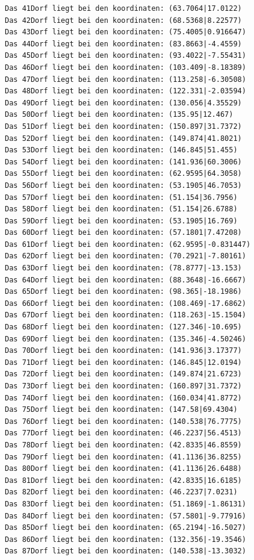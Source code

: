 \documentclass{article}
\begin{document}
\begin{verbatim}
Das 41Dorf liegt bei den koordinaten: (63.7064|17.0122)
Das 42Dorf liegt bei den koordinaten: (68.5368|8.22577)
Das 43Dorf liegt bei den koordinaten: (75.4005|0.916647)
Das 44Dorf liegt bei den koordinaten: (83.8663|-4.4559)
Das 45Dorf liegt bei den koordinaten: (93.4022|-7.55431)
Das 46Dorf liegt bei den koordinaten: (103.409|-8.18389)
Das 47Dorf liegt bei den koordinaten: (113.258|-6.30508)
Das 48Dorf liegt bei den koordinaten: (122.331|-2.03594)
Das 49Dorf liegt bei den koordinaten: (130.056|4.35529)
Das 50Dorf liegt bei den koordinaten: (135.95|12.467)
Das 51Dorf liegt bei den koordinaten: (150.897|31.7372)
Das 52Dorf liegt bei den koordinaten: (149.874|41.8021)
Das 53Dorf liegt bei den koordinaten: (146.845|51.455)
Das 54Dorf liegt bei den koordinaten: (141.936|60.3006)
Das 55Dorf liegt bei den koordinaten: (62.9595|64.3058)
Das 56Dorf liegt bei den koordinaten: (53.1905|46.7053)
Das 57Dorf liegt bei den koordinaten: (51.154|36.7956)
Das 58Dorf liegt bei den koordinaten: (51.154|26.6788)
Das 59Dorf liegt bei den koordinaten: (53.1905|16.769)
Das 60Dorf liegt bei den koordinaten: (57.1801|7.47208)
Das 61Dorf liegt bei den koordinaten: (62.9595|-0.831447)
Das 62Dorf liegt bei den koordinaten: (70.2921|-7.80161)
Das 63Dorf liegt bei den koordinaten: (78.8777|-13.153)
Das 64Dorf liegt bei den koordinaten: (88.3648|-16.6667)
Das 65Dorf liegt bei den koordinaten: (98.365|-18.1986)
Das 66Dorf liegt bei den koordinaten: (108.469|-17.6862)
Das 67Dorf liegt bei den koordinaten: (118.263|-15.1504)
Das 68Dorf liegt bei den koordinaten: (127.346|-10.695)
Das 69Dorf liegt bei den koordinaten: (135.346|-4.50246)
Das 70Dorf liegt bei den koordinaten: (141.936|3.17377)
Das 71Dorf liegt bei den koordinaten: (146.845|12.0194)
Das 72Dorf liegt bei den koordinaten: (149.874|21.6723)
Das 73Dorf liegt bei den koordinaten: (160.897|31.7372)
Das 74Dorf liegt bei den koordinaten: (160.034|41.8772)
Das 75Dorf liegt bei den koordinaten: (147.58|69.4304)
Das 76Dorf liegt bei den koordinaten: (140.538|76.7775)
Das 77Dorf liegt bei den koordinaten: (46.2237|56.4513)
Das 78Dorf liegt bei den koordinaten: (42.8335|46.8559)
Das 79Dorf liegt bei den koordinaten: (41.1136|36.8255)
Das 80Dorf liegt bei den koordinaten: (41.1136|26.6488)
Das 81Dorf liegt bei den koordinaten: (42.8335|16.6185)
Das 82Dorf liegt bei den koordinaten: (46.2237|7.0231)
Das 83Dorf liegt bei den koordinaten: (51.1869|-1.86131)
Das 84Dorf liegt bei den koordinaten: (57.5801|-9.77916)
Das 85Dorf liegt bei den koordinaten: (65.2194|-16.5027)
Das 86Dorf liegt bei den koordinaten: (132.356|-19.3546)
Das 87Dorf liegt bei den koordinaten: (140.538|-13.3032)

\end{verbatim}
\end{document}
